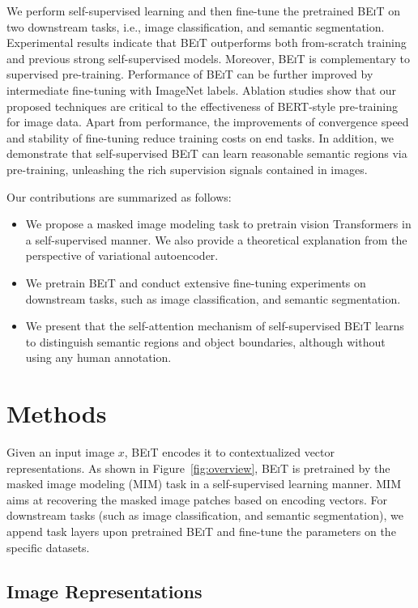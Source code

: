 \documentclass{article}
\newcommand\our{\textsc{BEiT}}
\begin{document}
We perform self-supervised learning and then fine-tune the pretrained \our{} on two downstream tasks, i.e., image classification, and semantic segmentation.
Experimental results indicate that \our{} outperforms both from-scratch training and previous strong self-supervised models.
Moreover, \our{} is complementary to supervised pre-training. Performance of \our{} can be further improved by intermediate fine-tuning with ImageNet labels.
Ablation studies show that our proposed techniques are critical to the effectiveness of BERT-style pre-training for image data.
Apart from performance, the improvements of convergence speed and stability of fine-tuning reduce training costs on end tasks.
In addition, we demonstrate that self-supervised \our{} can learn reasonable semantic regions via pre-training, unleashing the rich supervision signals contained in images.

Our contributions are summarized as follows:
\begin{itemize}[leftmargin=1.5em]
\item We propose a masked image modeling task to pretrain vision Transformers in a self-supervised manner. We also provide a theoretical explanation from the perspective of variational autoencoder.
\item We pretrain \our{} and conduct extensive fine-tuning experiments on downstream tasks, such as image classification, and semantic segmentation.
\item We present that the self-attention mechanism of self-supervised \our{} learns to distinguish semantic regions and object boundaries, although without using any human annotation.
\end{itemize}


\section{Methods}
\label{sec:methods}


Given an input image $x$, \our{} encodes it to contextualized vector representations.
As shown in Figure~\ref{fig:overview}, \our{} is pretrained by the masked image modeling (MIM) task in a self-supervised learning manner.
MIM aims at recovering the masked image patches based on encoding vectors.
For downstream tasks (such as image classification, and semantic segmentation), we append task layers upon pretrained \our{} and fine-tune the parameters on the specific datasets.


\subsection{Image Representations}
\label{sec:image:repr}
\end{document}
